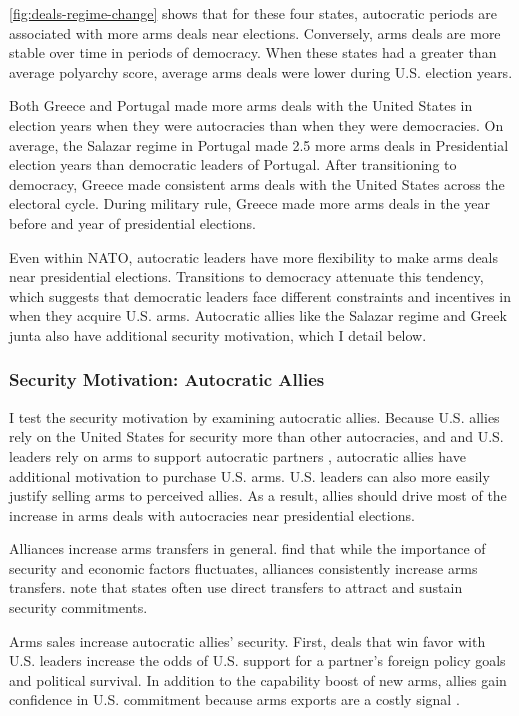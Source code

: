 \documentclass[12pt]{article}
\begin{document}
\autoref{fig:deals-regime-change} shows that for these four states, autocratic periods are associated with more arms deals near elections.
Conversely, arms deals are more stable over time in periods of democracy. 
When these states had a greater than average polyarchy score, average arms deals were lower during U.S. election years. 


Both Greece and Portugal made more arms deals with the United States in election years when they were autocracies than when they were democracies.
On average, the Salazar regime in Portugal made 2.5 more arms deals in Presidential election years than democratic leaders of Portugal.
After transitioning to democracy, Greece made consistent arms deals with the United States across the electoral cycle.
During military rule, Greece made more arms deals in the year before and year of presidential elections.


Even within NATO, autocratic leaders have more flexibility to make arms deals near presidential elections. 
Transitions to democracy attenuate this tendency, which suggests that democratic leaders face different constraints and incentives in when they acquire U.S. arms. 
Autocratic allies like the Salazar regime and Greek junta also have additional security motivation, which I detail below. 



\subsubsection{Security Motivation: Autocratic Allies}


I test the security motivation by examining autocratic allies. 
Because U.S. allies rely on the United States for security more than other autocracies, and and U.S. leaders rely on arms to support autocratic partners \citep{Yarhi-Miloetal2016}, autocratic allies have additional motivation to purchase U.S. arms. 
U.S. leaders can also more easily justify selling arms to perceived allies. 
As a result, allies should drive most of the increase in arms deals with autocracies near presidential elections. 


Alliances increase arms transfers in general. 
\citet{Thurneretal2019} find that while the importance of security and economic factors fluctuates, alliances consistently increase arms transfers.
\citet[pg. 184-5]{IkenberryGrieco2003} note that states often use direct transfers to attract and sustain security commitments. 


Arms sales increase autocratic allies' security.
First, deals that win favor with U.S. leaders increase the odds of U.S. support for a partner's foreign policy goals and political survival.  
In addition to the capability boost of new arms, allies gain confidence in U.S. commitment because arms exports are a costly signal \citep{McManusYarhi-Milo2017}.
\end{document}
